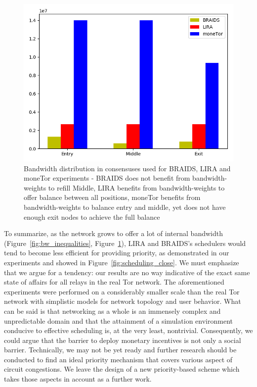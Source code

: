 \begin{figure}
	\centering
  \includegraphics[scale=0.415]{images/bw_analysis_comp.png}
  \caption{Bandwidth distribution in consensuses used for BRAIDS, LIRA and moneTor experiments - BRAIDS does not benefit from bandwidth-weights to refill Middle, LIRA benefits from bandwidth-weights to offer balance between all positions, moneTor benefits from bandwidth-weights to balance entry and middle, yet does not have enough exit nodes to achieve the full balance} 
  \label{fig:bw_comp}
\end{figure}

 
To summarize, as the network grows to offer a lot of internal bandwidth (Figure~\ref{fig:bw_inequalities}, Figure~\ref{fig:bw_comp}), LIRA and BRAIDS's schedulers would tend to become less efficient for providing priority, as demonstrated in our experiments and showed in Figure~\ref{fig:scheduling_close}. 
We must emphasize that we argue for a tendency: our results are no way indicative of the exact same state of affairs for all relays in the real Tor network. The aforementioned experiments
were performed on a considerably smaller scale than the real Tor network with simplistic models for
network topology and user behavior. What can be said is that networking as a
whole is an immensely complex and unpredictable domain and that the attainment
of a simulation environment conducive to effective scheduling is, at the very
least, nontrivial. Consequently, we could argue that the barrier to deploy monetary incentives is not only a social barrier. Technically, we may not be yet ready and further research should be conducted to find  an ideal priority mechanism that covers various
aspect of circuit congestions. We leave the design of a new priority-based scheme which takes those aspects in account as a further work.

